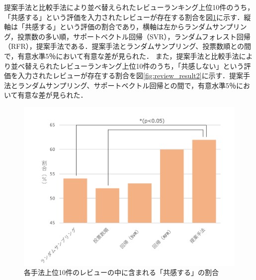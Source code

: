 \documentclass[a4paper,11pt,oneside,openany]{jsbook}
\begin{document}
提案手法と比較手法により並べ替えられたレビューランキング上位10件のうち，「共感する」という評価を入力されたレビューが存在する割合を図\ref{fig:review_result1}に示す．縦軸は「共感する」という評価の割合であり，横軸は左からランダムサンプリング，投票数の多い順，サポートベクトル回帰（SVR），ランダムフォレスト回帰（RFR），提案手法である．提案手法とランダムサンプリング、投票数順との間で，有意水準5％において有意な差が見られた．
また，提案手法と比較手法により並べ替えられたレビューランキング上位10件のうち，「共感しない」という評価を入力されたレビューが存在する割合を図\ref{fig:review_result2}に示す．提案手法とランダムサンプリング、サポートベクトル回帰との間で，有意水準5％において有意な差が見られた．
\begin{figure}[htb]
	\begin{center} %
		\includegraphics [width = 120mm] {figures/review_result1.pdf} %
	\end{center}
	\caption{各手法上位10件のレビューの中に含まれる「共感する」の割合} %
	\label{fig:review_result1} %
\end{figure}
\end{document}
